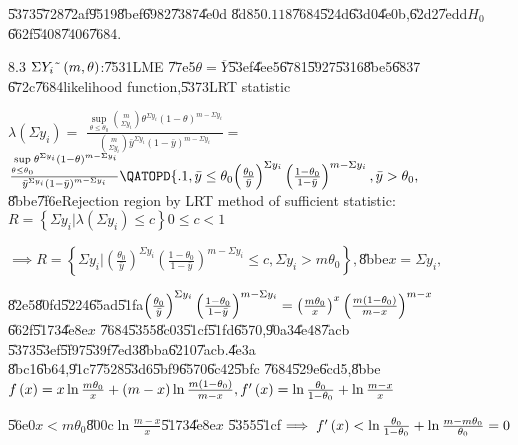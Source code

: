 \documentclass{article}
\begin{document}
\bigskip \U{5373}\U{5728}\U{72af}\U{9519}\U{8bef}\U{6982}\U{7387}\U{4e0d}%
\U{8d85}$0.118$\U{7684}\U{524d}\U{63d0}\U{4e0b},\U{62d2}\U{7edd}$H_{0}$%
\U{662f}\U{5408}\U{7406}\U{7684}.

8.3 $\Sigma Y_{i}\symbol{126}\left( m,\theta \right) $:\U{7531}LME \U{77e5}$%
\theta =\overline{Y}$\U{53ef}\U{4ee5}\U{6781}\U{5927}\U{5316}\U{8be5}\U{6837}%
\U{672c}\U{7684}likelihood function,\U{5373}LRT statistic

$\lambda \left( \Sigma y_{i}\right) =$ $\frac{\underset{\theta \leq \theta
_{0}}{\sup }\binom{m}{\Sigma y_{i}}\theta ^{\Sigma y_{i}}\left( 1-\theta
\right) ^{m-\Sigma y_{i}}}{\binom{m}{\Sigma y_{i}}\bar{y}^{\Sigma
y_{i}}\left( 1-\bar{y}\right) ^{m-\Sigma y_{i}}}=$ $\frac{\underset{\theta
\leq \theta _{0}}{\sup }\theta ^{\Sigma y_{i}}\left( 1-\theta \right)
^{m-\Sigma y_{i}}}{\bar{y}^{\Sigma y_{i}}\left( 1-\bar{y}\right) ^{m-\Sigma
y_{i}}}\QATOPD\{ . {1,\bar{y}\leq \theta _{0}}{\left( \frac{\theta _{0}}{%
\bar{y}}\right) ^{\Sigma y_{i}}\left( \frac{1-\theta _{0}}{1-\bar{y}}\right)
^{m-\Sigma y_{i}},\bar{y}>\theta _{0}},$\U{8bbe}\U{7f6e}Rejection region by
LRT method of sufficient statistic:$R=\left\{ \Sigma y_{i}|\lambda \left(
\Sigma y_{i}\right) \leq c\right\} 0\leq c<1$

$\implies R=\left\{ \Sigma y_{i}|\left( \frac{\theta _{0}}{\bar{y}}\right)
^{\Sigma y_{i}}\left( \frac{1-\theta _{0}}{1-\bar{y}}\right) ^{m-\Sigma
y_{i}}\leq c,\Sigma y_{i}>m\theta _{0}\right\} ,$\U{8bbe}$x=\Sigma y_{i},$

\U{82e5}\U{80fd}\U{5224}\U{65ad}\U{51fa}$\left( \frac{\theta _{0}}{\bar{y}}%
\right) ^{\Sigma y_{i}}\left( \frac{1-\theta _{0}}{1-\bar{y}}\right)
^{m-\Sigma y_{i}}=\left( \frac{m\theta _{0}}{x}\right) ^{x}\left( \frac{%
m\left( 1-\theta _{0}\right) }{m-x}\right) ^{m-x}$\U{662f}\U{5173}\U{4e8e}$x$%
\U{7684}\U{5355}\U{8c03}\U{51cf}\U{51fd}\U{6570},\U{90a3}\U{4e48}\U{7acb}%
\U{5373}\U{53ef}\U{5f97}\U{539f}\U{7ed3}\U{8bba}\U{6210}\U{7acb}.\U{4e3a}%
\U{8bc1}\U{6b64},\U{91c7}\U{7528}\U{53d6}\U{5bf9}\U{6570}\U{6c42}\U{5bfc}%
\U{7684}\U{529e}\U{6cd5},\U{8bbe}$f\left( x\right) =x\ln \frac{m\theta _{0}}{%
x}+\left( m-x\right) \ln \frac{m\left( 1-\theta _{0}\right) }{m-x},f^{\prime
}\left( x\right) =\ln \frac{\theta _{0}}{1-\theta _{0}}+\ln \frac{m-x}{x}$

\U{56e0}$x<m\theta _{0}$\U{800c}$\ln \frac{m-x}{x}$\U{5173}\U{4e8e}$x$%
\U{5355}\U{51cf}$\implies f^{\prime }\left( x\right) <\ln \frac{\theta _{0}}{%
1-\theta _{0}}+\ln \frac{m-m\theta _{0}}{\theta _{0}}=0$
\end{document}

